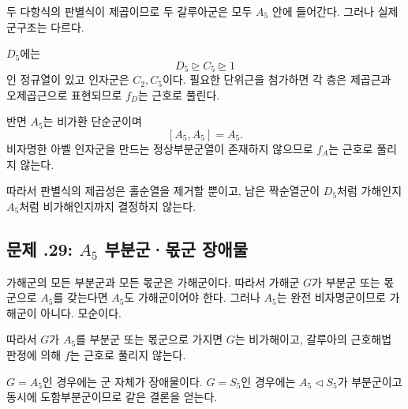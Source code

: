 \begin{solution}
두 다항식의 판별식이 제곱이므로 두 갈루아군은 모두 $A_5$ 안에 들어간다. 그러나 실제 군구조는 다르다.

$D_5$에는
\[
  D_5\trianglerighteq C_5\trianglerighteq1
\]
인 정규열이 있고 인자군은 $C_2,C_5$이다. 필요한 단위근을 첨가하면 각 층은 제곱근과 오제곱근으로 표현되므로 $f_D$는 근호로 풀린다.

반면 $A_5$는 비가환 단순군이며
\[
  [A_5,A_5]=A_5.
\]
비자명한 아벨 인자군을 만드는 정상부분군열이 존재하지 않으므로 $f_A$는 근호로 풀리지 않는다.

따라서 판별식의 제곱성은 홀순열을 제거할 뿐이고, 남은 짝순열군이 $D_5$처럼 가해인지 $A_5$처럼 비가해인지까지 결정하지 않는다.
\end{solution}

\subsection*{문제 \thechapter.29: $A_5$ 부분군·몫군 장애물}

\begin{solution}
가해군의 모든 부분군과 모든 몫군은 가해군이다. 따라서 가해군 $G$가 부분군 또는 몫군으로 $A_5$를 갖는다면 $A_5$도 가해군이어야 한다. 그러나 $A_5$는 완전 비자명군이므로 가해군이 아니다. 모순이다.

따라서 $G$가 $A_5$를 부분군 또는 몫군으로 가지면 $G$는 비가해이고, 갈루아의 근호해법 판정에 의해 $f$는 근호로 풀리지 않는다.

$G=A_5$인 경우에는 군 자체가 장애물이다. $G=S_5$인 경우에는 $A_5\triangleleft S_5$가 부분군이고 동시에 도함부분군이므로 같은 결론을 얻는다.
\end{solution}
